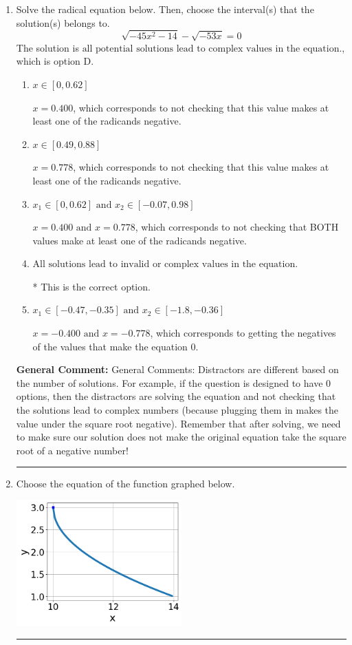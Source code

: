\documentclass{extbook}[14pt]
\newcommand{\litem}[1]{\item #1

\rule{\textwidth}{0.4pt}}
\begin{document}
\begin{enumerate}\litem{
Solve the radical equation below. Then, choose the interval(s) that the solution(s) belongs to.
\[ \sqrt{-45 x^2 - 14} - \sqrt{-53 x} = 0 \]
The solution is \( \text{all potential solutions lead to complex values in the equation.} \), which is option D.\begin{enumerate}[label=\Alph*.]
\item \( x \in [0,0.62] \)

$x = 0.400$, which corresponds to not checking that this value makes at least one of the radicands negative.
\item \( x \in [0.49,0.88] \)

$x = 0.778$, which corresponds to not checking that this value makes at least one of the radicands negative.
\item \( x_1 \in [0, 0.62] \text{ and } x_2 \in [-0.07,0.98] \)

$x = 0.400 \text{ and } x = 0.778$, which corresponds to not checking that BOTH values make at least one of the radicands negative.
\item \( \text{All solutions lead to invalid or complex values in the equation.} \)

* This is the correct option.
\item \( x_1 \in [-0.47, -0.35] \text{ and } x_2 \in [-1.8,-0.36] \)

$x = -0.400 \text{ and } x = -0.778$, which corresponds to getting the negatives of the values that make the equation 0.
\end{enumerate}

\textbf{General Comment:} General Comments: Distractors are different based on the number of solutions. For example, if the question is designed to have 0 options, then the distractors are solving the equation and not checking that the solutions lead to complex numbers (because plugging them in makes the value under the square root negative). Remember that after solving, we need to make sure our solution does not make the original equation take the square root of a negative number!
}
\litem{
Choose the equation of the function graphed below.

\begin{center}
    \includegraphics[width=0.5\textwidth]{../Figures/radicalGraphToEquationB.png}
\end{center}



}
\end{enumerate}
\end{document}
